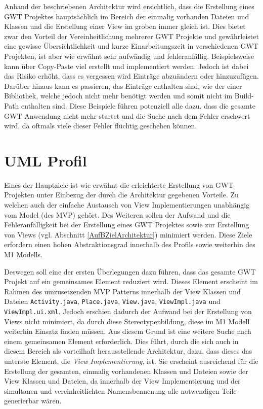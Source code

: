 Anhand der beschriebenen Architektur wird ersichtlich, dass die Erstellung eines
GWT Projektes hauptsächlich im Bereich der einmalig vorhanden Dateien und
Klassen und die Erstellung einer View im groben immer gleich ist. Dies bietet
zwar den Vorteil der Vereinheitlichung mehrerer GWT Projekte und gewährleistet
eine gewisse Übersichtlichkeit und kurze Einarbeitungszeit in verschiedenen GWT
Projekten, ist aber wie erwähnt sehr aufwändig und fehleranfällig.
Beispielsweise kann über \glqq{}Copy-Paste\grqq{} viel erstellt und
implementiert werden. Jedoch ist dabei das Risiko erhöht, dass es vergessen wird Einträge abzuändern oder
hinzuzufügen. Darüber hinaus kann es passieren, das Einträge enthalten sind, wie
der einer Bibliothek, welche jedoch nicht mehr benötigt werden und somit nicht
im Build-Path enthalten sind.
Diese Beispiele führen potenziell alle dazu, dass die gesamte GWT Anwendung nicht mehr startet
und die Suche nach dem Fehler erschwert wird, da oftmals viele dieser
Fehler flüchtig geschehen können. 
\section{UML Profil}\label{AufBProfil}
Eines der Hauptziele ist wie erwähnt die erleichterte Erstellung von GWT
Projekten unter Einbezug der durch die Architektur gegebenen Vorteile. Zu
welchen auch der einfache Austausch von View Implementierungen unabhängig vom
Model (des MVP) gehört. Des Weiteren sollen der Aufwand und die
Fehleranfälligkeit bei der Erstellung eines GWT Projektes sowie zur Erstellung von Views (vgl.
Abschnitt \ref{AufBZielArchitektur}) minimiert werden. Diese Ziele
erfordern einen hohen Abstraktionsgrad innerhalb des Profils sowie weiterhin des
M1 Modells.

Deswegen soll eine der ersten Überlegungen dazu führen, dass das
gesamte GWT Projekt auf ein gemeinsames Element reduziert wird. Dieses
Element erscheint im Rahmen des umzusetzenden
MVP Patterns innerhalb der View Klassen und Dateien
\texttt{Activity.java}, \texttt{Place.java},
\texttt{View.java}, \texttt{ViewImpl.java}
und \texttt{ViewImpl.ui.xml}. Jedoch erschien dadurch der Aufwand bei der
Erstellung von Views nicht minimiert, da durch diese Stereotypenbildung, diese
im M1 Modell weiterhin Einsatz finden müssen. Aus diesem Grund ist eine weitere
Suche nach einem gemeinsamen Element erforderlich. Dies führt, durch die sich
auch in diesem Bereich als vorteilhaft herausstellende Architektur, dazu, dass
dieses das unterste Element, die \textit{View Implementierung}, ist. Sie
erscheint ausreichend für die Erstellung der gesamten, einmalig vorhandenen
Klassen und Dateien sowie der View Klassen und Dateien, da innerhalb der View
Implementierung und der simultanen und vereinheitlichten Namensbennenung alle
notwendigen Teile generierbar wären. 


